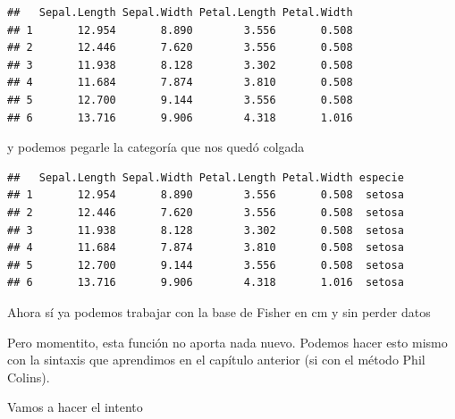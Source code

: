\documentclass[
]{book}
\newenvironment{Shaded}{\begin{snugshade}}{\end{snugshade}}
\newcommand{\CommentTok}[1]{\textcolor[rgb]{0.56,0.35,0.01}{\textit{#1}}}
\newcommand{\DecValTok}[1]{\textcolor[rgb]{0.00,0.00,0.81}{#1}}
\newcommand{\FloatTok}[1]{\textcolor[rgb]{0.00,0.00,0.81}{#1}}
\newcommand{\FunctionTok}[1]{\textcolor[rgb]{0.00,0.00,0.00}{#1}}
\newcommand{\NormalTok}[1]{#1}
\newcommand{\OtherTok}[1]{\textcolor[rgb]{0.56,0.35,0.01}{#1}}
\newcommand{\SpecialCharTok}[1]{\textcolor[rgb]{0.00,0.00,0.00}{#1}}
\begin{document}
\begin{verbatim}
##   Sepal.Length Sepal.Width Petal.Length Petal.Width
## 1       12.954       8.890        3.556       0.508
## 2       12.446       7.620        3.556       0.508
## 3       11.938       8.128        3.302       0.508
## 4       11.684       7.874        3.810       0.508
## 5       12.700       9.144        3.556       0.508
## 6       13.716       9.906        4.318       1.016
\end{verbatim}

y podemos pegarle la categoría que nos quedó colgada

\begin{Shaded}
\end{Shaded}

\begin{verbatim}
##   Sepal.Length Sepal.Width Petal.Length Petal.Width especie
## 1       12.954       8.890        3.556       0.508  setosa
## 2       12.446       7.620        3.556       0.508  setosa
## 3       11.938       8.128        3.302       0.508  setosa
## 4       11.684       7.874        3.810       0.508  setosa
## 5       12.700       9.144        3.556       0.508  setosa
## 6       13.716       9.906        4.318       1.016  setosa
\end{verbatim}

Ahora sí ya podemos trabajar con la base de Fisher en cm y sin perder datos

Pero momentito, esta función no aporta nada nuevo. Podemos hacer esto mismo con la sintaxis que aprendimos en el capítulo anterior (si con el método Phil Colins).

Vamos a hacer el intento

\begin{Shaded}
\end{Shaded}
\end{document}
